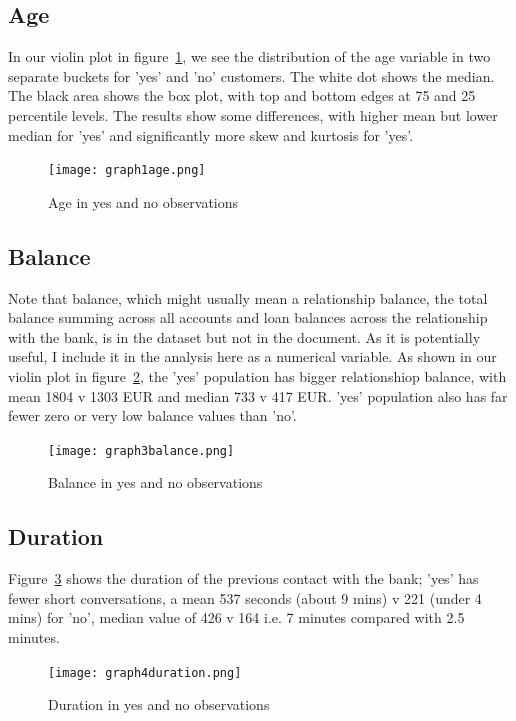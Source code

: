 \documentclass[9pt,technote]{IEEEtran}
\begin{document}
\subsection{Age}

In our violin plot in figure~\ref{fig:graph1age}, we see the distribution of the age variable in two separate buckets for 'yes' and 'no' customers.  The white dot shows the median.  The black area shows the box plot, with top and bottom edges at 75 and 25 percentile levels.  The results show some differences, with higher mean but lower median for 'yes' and significantly more skew and kurtosis for 'yes'.

\begin{figure}[htbp]
\centerline{\texttt{[image: graph1age.png]}}
\caption{Age in yes and no observations}
\label{fig:graph1age}
\end{figure}

\subsection{Balance}

Note that balance, which might usually mean a relationship balance, the total balance summing across all accounts and loan balances across the relationship with the bank, is in the dataset but not in the document.  As it is potentially useful, I include it in the analysis here as a numerical variable.  As shown in our violin plot in figure~\ref{fig:graph3balance}, the 'yes' population has bigger relationshiop balance, with mean 1804 v 1303 EUR and median 733 v 417 EUR. 'yes' population also has far fewer zero or very low balance values than 'no'.  

\begin{figure}[htbp]
\centerline{\texttt{[image: graph3balance.png]}}
\caption{Balance in yes and no observations}
\label{fig:graph3balance}
\end{figure}

\subsection{Duration}

Figure~\ref{fig:graph4duration} shows the duration of the previous contact with the bank; 'yes' has fewer short conversations, a mean 537 seconds (about 9 mins) v 221 (under 4 mins) for 'no', median value of 426 v 164 i.e. 7 minutes compared with 2.5 minutes.  

\begin{figure}[htbp]
\centerline{\texttt{[image: graph4duration.png]}}
\caption{Duration in yes and no observations}
\label{fig:graph4duration}
\end{figure}
\end{document}
